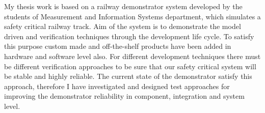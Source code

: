My thesis work is based on a railway demonstrator system developed by the students of Measurement and Information Systems department, which simulates a safety critical railway track. Aim of the system is to demonstrate the model driven and verification techniques through the development life cycle. To satisfy this purpose custom made and off-the-shelf products have been added in hardware and software level also. For different development techniques there must be different verification approaches to be sure that our safety critical system will be stable and highly reliable. The current state of the demonstrator satisfy this approach, therefore I have investigated and designed test approaches for improving the demonstrator reliability in component, integration and system level.


\vfill
\selectthesislanguage

\setcounter{romanPage}{\value{page}}
